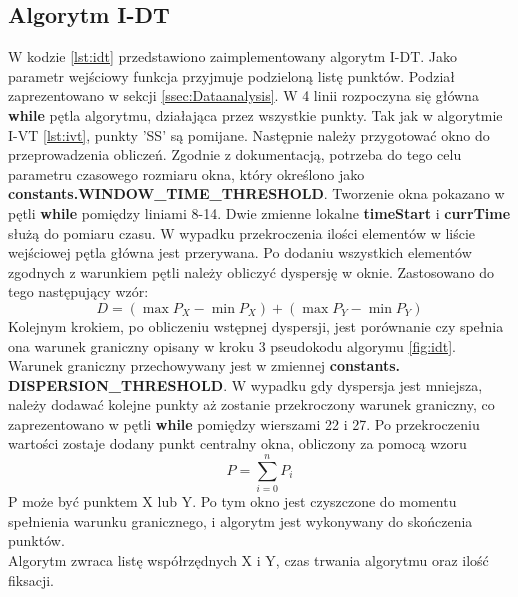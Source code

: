 \subsection{Algorytm I-DT}
\label{ssec:implementidt}
W kodzie \ref{lst:idt} przedstawiono zaimplementowany algorytm I-DT. Jako parametr wejściowy funkcja przyjmuje podzieloną listę punktów. Podział zaprezentowano w sekcji \ref{ssec:Dataanalysis}. W 4 linii rozpoczyna się główna \textbf{while} pętla algorytmu, działająca przez wszystkie punkty. Tak jak w algorytmie I-VT \ref{lst:ivt}, punkty 'SS' są pomijane. Następnie należy przygotować okno do przeprowadzenia obliczeń. Zgodnie z dokumentacją, potrzeba do tego celu parametru czasowego rozmiaru okna, który określono jako \textbf{constants.WINDOW\_TIME\_THRESHOLD}. Tworzenie okna pokazano w pętli \textbf{while} pomiędzy liniami 8-14. Dwie zmienne lokalne \textbf{timeStart} i \textbf{currTime} służą do pomiaru czasu. W wypadku przekroczenia ilości elementów w liście wejściowej pętla główna jest przerywana. Po dodaniu wszystkich elementów zgodnych z warunkiem pętli należy obliczyć dyspersję w oknie. Zastosowano do tego następujący wzór:
\[
        D = (\max{P_X} - \min{P_X}) + (\max{P_Y} - \min{P_Y})
\]
Kolejnym krokiem, po obliczeniu wstępnej dyspersji, jest porównanie czy spełnia ona warunek graniczny opisany w kroku 3 pseudokodu algorymu \ref{fig:idt}. Warunek graniczny przechowywany jest w zmiennej \textbf{constants. DISPERSION\_THRESHOLD}. W wypadku gdy dyspersja jest mniejsza, należy dodawać kolejne punkty aż zostanie przekroczony warunek graniczny, co zaprezentowano w pętli \textbf{while} pomiędzy wierszami 22 i 27. Po przekroczeniu wartości zostaje dodany punkt centralny okna, obliczony za pomocą wzoru
\[
        P = \sum_{i = 0}^{n}{P_i}
\]
P może być punktem X lub Y. Po tym okno jest czyszczone do momentu spełnienia warunku granicznego, i algorytm jest wykonywany do skończenia punktów.\\
Algorytm zwraca listę współrzędnych X i Y, czas trwania algorytmu oraz ilość fiksacji.
